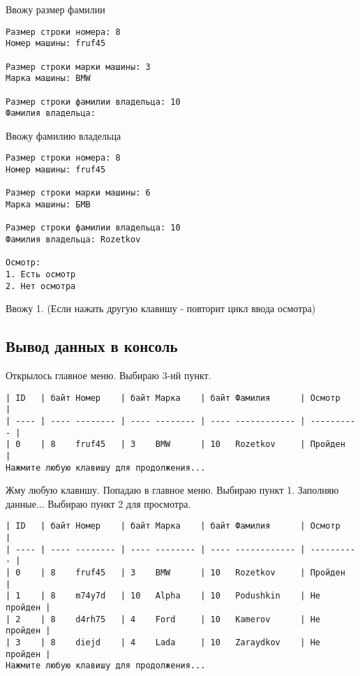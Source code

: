 Ввожу размер фамилии

\begin{tcolorbox}
\begin{verbatim}
Размер строки номера: 8
Номер машины: fruf45

Размер строки марки машины: 3
Марка машины: BMW

Размер строки фамилии владельца: 10
Фамилия владельца:
\end{verbatim}
\end{tcolorbox}

Ввожу фамилию владельца

\begin{tcolorbox}
\begin{verbatim}
Размер строки номера: 8
Номер машины: fruf45

Размер строки марки машины: 6
Марка машины: БМВ

Размер строки фамилии владельца: 10
Фамилия владельца: Rozetkov

Осмотр:       
1. Есть осмотр
2. Нет осмотра
\end{verbatim}
\end{tcolorbox}

Ввожу 1. (Если нажать другую клавишу - повторит цикл ввода осмотра)

\subsection{Вывод данных в консоль}

Открылось главное меню. Выбираю 3-ий пункт.

\begin{tcolorbox}
\begin{verbatim}
| ID   | байт Номер    | байт Марка    | байт Фамилия      | Осмотр     |
| ---- | ---- -------- | ---- -------- | ---- ------------ | ---------- |
| 0    | 8    fruf45   | 3    BMW      | 10   Rozetkov     | Пройден    |
Нажмите любую клавишу для продолжения...
\end{verbatim}
\end{tcolorbox}

Жму любую клавишу. Попадаю в главное меню. Выбираю пункт 1. Заполняю данные... Выбираю пункт 2 для просмотра.

\begin{tcolorbox}
\begin{verbatim}
| ID   | байт Номер    | байт Марка    | байт Фамилия      | Осмотр     |
| ---- | ---- -------- | ---- -------- | ---- ------------ | ---------- |
| 0    | 8    fruf45   | 3    BMW      | 10   Rozetkov     | Пройден    |
| 1    | 8    m74y7d   | 10   Alpha    | 10   Podushkin    | Не пройден |
| 2    | 8    d4rh75   | 4    Ford     | 10   Kamerov      | Не пройден |
| 3    | 8    diejd    | 4    Lada     | 10   Zaraydkov    | Не пройден |
Нажмите любую клавишу для продолжения...
\end{verbatim}
\end{tcolorbox}

